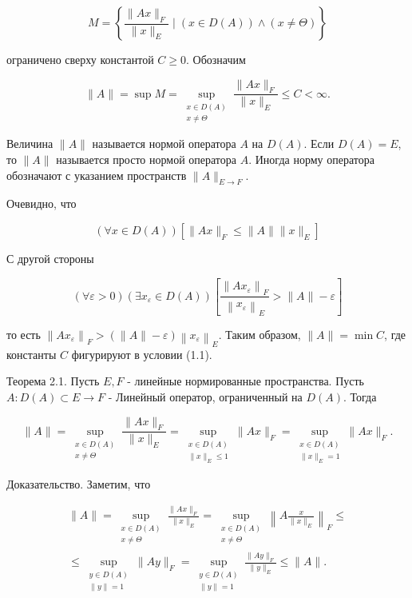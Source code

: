 $$
	M=\left\{\frac{\|A x\|_{F}}{\|x\|_{E}} \mid(x \in D(A)) \wedge(x \neq \Theta)\right\}
$$

ограничено сверху константой $C \geq 0$. Обозначим

$$
	\|A\|=\sup M=\sup _{\substack{x \in D(A) \\ x \neq \Theta}} \frac{\|A x\|_{F}}{\|x\|_{E}} \leq C<\infty .
$$

Величина $\|A\|$ называется нормой оператора $A$ на $D(A)$. Если $D(A)=E$, то $\|A\|$ называется просто нормой оператора $A$. Иногда норму оператора обозначают с указанием пространств $\|A\|_{E \rightarrow F}$.

Очевидно, что

$$
	(\forall x \in D(A))\left[\|A x\|_{F} \leq\|A\|\|x\|_{E}\right]
$$

С другой стороны

$$
	(\forall \varepsilon>0)\left(\exists x_{\varepsilon} \in D(A)\right)\left[\frac{\left\|A x_{\varepsilon}\right\|_{F}}{\left\|x_{\varepsilon}\right\|_{E}}>\|A\|-\varepsilon\right]
$$

то есть $\left\|A x_{\varepsilon}\right\|_{F}>(\|A\|-\varepsilon)\left\|x_{\varepsilon}\right\|_{E}$. Таким образом, $\|A\|=\min C$, где константы $C$ фигурируют в условии (1.1).

Теорема 2.1. Пусть $E, F$ - линейные нормированные пространства. Пусть $A: D(A) \subset E \rightarrow F$ - Линейный оператор, ограниченный на $D(A)$. Тогда

$$
	\|A\|=\sup _{\substack{x \in D(A) \\ x \neq \Theta}} \frac{\|A x\|_{F}}{\|x\|_{E}}=\sup _{\substack{x \in D(A) \\\|x\|_{E} \leq 1}}\|A x\|_{F}=\sup _{\substack{x \in D(A) \\\|x\|_{E}=1}}\|A x\|_{F} .
$$

Доказательство. Заметим, что

$$
	\begin{gathered}
		\|A\|=\sup _{\substack{x \in D(A) \\
				x \neq \Theta}} \frac{\|A x\|_{F}}{\|x\|_{E}}=\sup _{\substack{x \in D(A) \\
				x \neq \Theta}}\left\|A \frac{x}{\|x\|_{E}}\right\|_{F} \leq \\
		\leq \sup _{\substack{y \in D(A) \\
				\|y\|=1}}\|A y\|_{F}=\sup _{\substack{y \in D(A) \\
				\|y\|=1}} \frac{\|A y\|_{F}}{\|y\|_{E}} \leq\|A\| .
	\end{gathered}
$$

